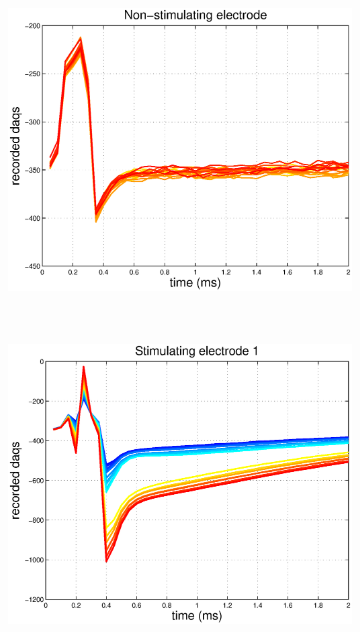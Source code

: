 \documentclass[12pt,letterpaper,fleqn]{article}
\begin{document}
\begin{figure}[ht!]
\begin{subfigure}[b]{0.32\textwidth}
                \caption{}
        \end{subfigure}
      ~  \begin{subfigure}[b]{0.32\textwidth}
                \includegraphics[width=\textwidth]{ArtTraceNS.eps}
                \caption{}
        \end{subfigure}
        \\
         \begin{subfigure}[b]{0.32\textwidth}
                \includegraphics[width=\textwidth]{ArtMeanS1.eps}
                \caption{}
        \end{subfigure}     

\end{figure}
\end{document}
